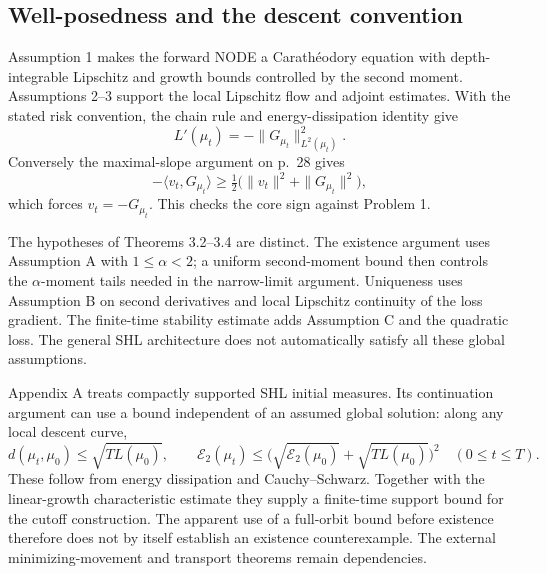 \documentclass[10pt]{article}
\begin{document}
\subsection*{Well-posedness and the descent convention}
Assumption 1 makes the forward NODE a Carathéodory equation with depth-integrable Lipschitz and growth bounds controlled by the second moment. Assumptions 2–3 support the local Lipschitz flow and adjoint estimates. With the stated risk convention, the chain rule and energy-dissipation identity give \[L'(\mu_t)=-\|G_{\mu_t}\|_{L^2(\mu_t)}^2.\] Conversely the maximal-slope argument on p. 28 gives \[-\langle v_t,G_{\mu_t}\rangle
 \geq \tfrac12\bigl(\|v_t\|^2+\|G_{\mu_t}\|^2\bigr),\] which forces \(v_t=-G_{\mu_t}\). This checks the core sign against Problem 1.\par
The hypotheses of Theorems 3.2–3.4 are distinct. The existence argument uses Assumption A with \(1\leq\alpha<2\); a uniform second-moment bound then controls the \(\alpha\)-moment tails needed in the narrow-limit argument. Uniqueness uses Assumption B on second derivatives and local Lipschitz continuity of the loss gradient. The finite-time stability estimate adds Assumption C and the quadratic loss. The general SHL architecture does not automatically satisfy all these global assumptions.\par
Appendix A treats compactly supported SHL initial measures. Its continuation argument can use a bound independent of an assumed global solution: along any local descent curve, \[d(\mu_t,\mu_0)\leq\sqrt{T L(\mu_0)},\qquad
 \mathcal E_2(\mu_t)\leq
 \bigl(\sqrt{\mathcal E_2(\mu_0)}+\sqrt{T L(\mu_0)}\bigr)^2
 \quad(0\leq t\leq T).\] These follow from energy dissipation and Cauchy–Schwarz. Together with the linear-growth characteristic estimate they supply a finite-time support bound for the cutoff construction. The apparent use of a full-orbit bound before existence therefore does not by itself establish an existence counterexample. The external minimizing-movement and transport theorems remain dependencies.\par
\end{document}

